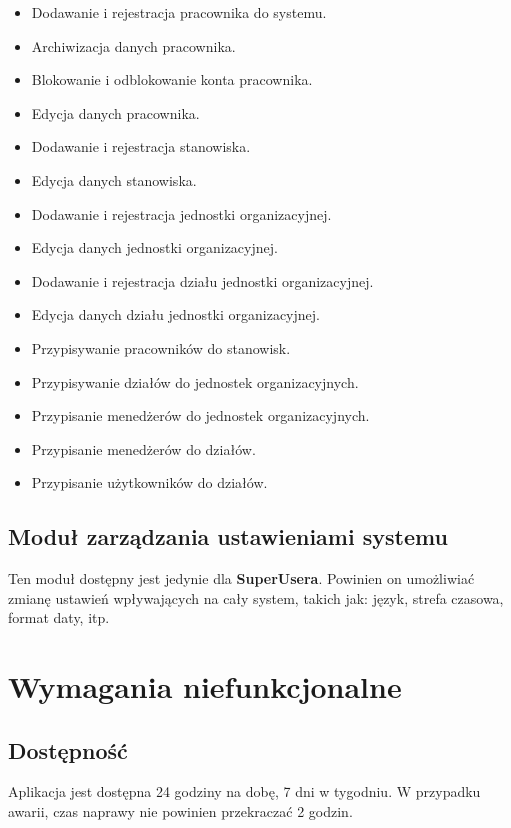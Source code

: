 \begin{itemize}
    \item {Dodawanie i rejestracja pracownika} do systemu.
    \item {Archiwizacja danych pracownika}.
    \item {Blokowanie i odblokowanie konta pracownika}.
    \item {Edycja danych pracownika}.
    \item {Dodawanie i rejestracja stanowiska}.
    \item {Edycja danych stanowiska}.
    \item {Dodawanie i rejestracja jednostki organizacyjnej}.
    \item {Edycja danych jednostki organizacyjnej}.
    \item {Dodawanie i rejestracja działu jednostki organizacyjnej}.
    \item {Edycja danych działu jednostki organizacyjnej}.
    \item {Przypisywanie pracowników do stanowisk}.
    \item {Przypisywanie działów do jednostek organizacyjnych}.
    \item {Przypisanie menedżerów do jednostek organizacyjnych}.
    \item {Przypisanie menedżerów do działów}.
    \item {Przypisanie użytkowników do działów}.
\end{itemize}

\subsection{Moduł zarządzania ustawieniami systemu}

Ten moduł dostępny jest jedynie dla \textbf{SuperUsera}. Powinien on umożliwiać zmianę ustawień wpływających na cały system, takich jak: język, strefa czasowa, format daty, itp.

\section{Wymagania niefunkcjonalne}

\subsection{Dostępność}

Aplikacja jest dostępna 24 godziny na dobę, 7 dni w tygodniu. W przypadku awarii, czas naprawy nie powinien przekraczać 2 godzin.

